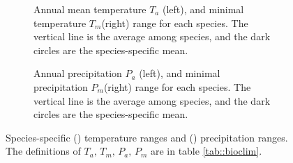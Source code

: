 \begin{refsection}
\begin{figure}[htb]
    \centering
	\begin{subfigure}{0.98\textwidth}
		
		\caption{Annual mean temperature $ T_a $ (left), and minimal temperature $ T_m $(right) range for each species. The vertical line is the average among species, and the dark circles are the species-specific mean.}
		\label{fig::annual_mean_temperature}
	\end{subfigure}
	\medskip
	\begin{subfigure}{0.98\textwidth}
		
		\caption{Annual precipitation $ P_a $ (left), and minimal precipitation $ P_m $(right) range for each species. The vertical line is the average among species, and the dark circles are the species-specific mean.}
		\label{fig::annual_precipitation}
	\end{subfigure}
\caption{Species-specific () temperature ranges and () precipitation ranges. The definitions of $ T_a, \, T_m, \, P_a, \, P_m $ are in table \ref{tab::bioclim}.}
\label{fig::speciesClimRange}
\end{figure}


\end{refsection}
